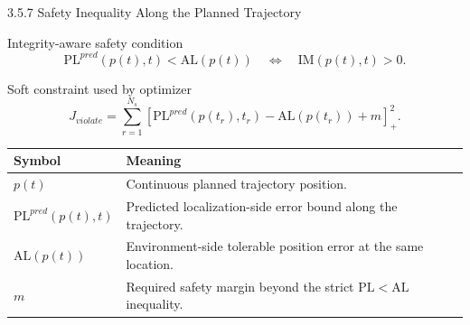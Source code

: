 \documentclass[10pt,aspectratio=169,xcolor=dvipsnames]{beamer}
\newcommand{\PL}{\mathrm{PL}}
\newcommand{\AL}{\mathrm{AL}}
\newcommand{\IM}{\mathrm{IM}}
\begin{document}
\begin{frame}{3.5.7 Safety Inequality Along the Planned Trajectory}
  \small
  \begin{block}{Integrity-aware safety condition}
    \[
      \PL^{pred}(p(t),t)<\AL(p(t))\quad\Longleftrightarrow\quad \IM(p(t),t)>0.
    \]
  \end{block}

  \begin{block}{Soft constraint used by optimizer}
    \[
      J_{violate}=\sum_{r=1}^{N_s}\left[\PL^{pred}(p(t_r),t_r)-\AL(p(t_r))+m\right]^2_+.
    \]
  \end{block}

  \begin{table}\scriptsize
    \begin{tabular}{p{} p{}}
      \toprule
      \textbf{Symbol} & \textbf{Meaning}\\
      \midrule
      $p(t)$ & Continuous planned trajectory position.\\
      $\PL^{pred}(p(t),t)$ & Predicted localization-side error bound along the trajectory.\\
      $\AL(p(t))$ & Environment-side tolerable position error at the same location.\\
      $m$ & Required safety margin beyond the strict $\PL<\AL$ inequality.\\
      \bottomrule
    \end{tabular}
  \end{table}
\end{frame}
\end{document}
